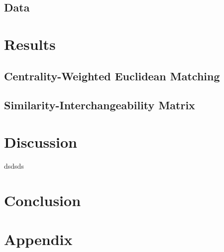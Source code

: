 \documentclass{article}
\begin{document}
\subsection{Data}

\section{Results}
\subsection{Centrality-Weighted Euclidean Matching}

\subsection{Similarity-Interchangeability Matrix}


\section{Discussion}
dsdsds \parencite[]{dsdsds}


\section{Conclusion} 


\newpage
\printbibliography[
    heading=bibintoc,
    title={References}
]


\newpage
\section*{Appendix}



\end{document}
